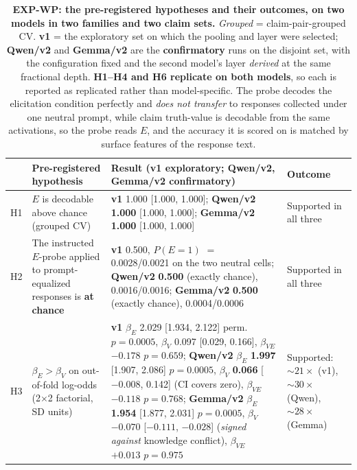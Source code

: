 \begin{table}[h]
\centering
\caption{\textbf{EXP-WP: the pre-registered hypotheses and their outcomes, on two models in two families and two claim sets.} \emph{Grouped} = claim-pair-grouped CV. \textbf{v1} = the exploratory set on which the pooling and layer were selected; \textbf{Qwen/v2} and \textbf{Gemma/v2} are the \textbf{confirmatory} runs on the disjoint set, with the configuration fixed and the second model's layer \emph{derived} at the same fractional depth. \textbf{H1--H4 and H6 replicate on both models}, so each is reported as replicated rather than model-specific. The probe decodes the elicitation condition perfectly and \emph{does not transfer} to responses collected under one neutral prompt, while claim truth-value is decodable from the same activations, so the probe reads $E$, and the accuracy it is scored on is matched by surface features of the response text.}
\label{tab:probe_audit}
\begin{scriptsize}
\setlength{\tabcolsep}{4pt}
\begin{tabular}{@{}p{0.24in}p{1.30in}p{2.55in}p{0.87in}@{}}
\toprule
& \textbf{Pre-registered hypothesis} & \textbf{Result (v1 exploratory; Qwen/v2, Gemma/v2 confirmatory)} & \textbf{Outcome} \\
\midrule
H1 & $E$ is decodable above chance (grouped CV) & \textbf{v1} 1.000 [1.000, 1.000]; \textbf{Qwen/v2} \textbf{1.000} [1.000, 1.000]; \textbf{Gemma/v2} \textbf{1.000} [1.000, 1.000] & Supported in all three \\
\addlinespace[1pt]
H2 & The instructed $E$-probe applied to prompt-equalized responses is \textbf{at chance} & \textbf{v1} 0.500, $P(E\!=\!1)$ $=$ 0.0028/0.0021 on the two neutral cells; \textbf{Qwen/v2} \textbf{0.500} (exactly chance), 0.0016/0.0016; \textbf{Gemma/v2} \textbf{0.500} (exactly chance), 0.0004/0.0006 & Supported in all three \\
\addlinespace[1pt]
H3 & $\beta_E > \beta_V$ on out-of-fold log-odds (2$\times$2 factorial, SD units) & \textbf{v1} $\beta_E$ 2.029 [1.934, 2.122] perm.\ $p\!=\!0.0005$, $\beta_V$ 0.097 [0.029, 0.166], $\beta_{VE}$ $-0.178$ $p\!=\!0.659$; \textbf{Qwen/v2} $\beta_E$ \textbf{1.997} [1.907, 2.086] $p\!=\!0.0005$, $\beta_V$ \textbf{0.066} [$-0.008$, 0.142] (CI covers zero), $\beta_{VE}$ $-0.118$ $p\!=\!0.768$; \textbf{Gemma/v2} $\beta_E$ \textbf{1.954} [1.877, 2.031] $p\!=\!0.0005$, $\beta_V$ \textbf{$-0.070$} [$-0.111$, $-0.028$] (\emph{signed against} knowledge conflict), $\beta_{VE}$ $+0.013$ $p\!=\!0.975$ & Supported: ${\sim}21\times$ (v1), ${\sim}30\times$ (Qwen), ${\sim}28\times$ (Gemma) \\

\end{tabular}
\end{scriptsize}
\end{table}
